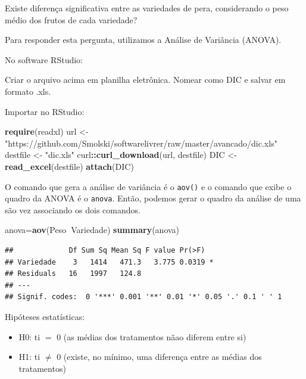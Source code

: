 \documentclass[12pt,brazil,]{book}
\newenvironment{Shaded}{\begin{snugshade}}{\end{snugshade}}
\newcommand{\KeywordTok}[1]{\textcolor[rgb]{0.13,0.29,0.53}{\textbf{#1}}}
\newcommand{\NormalTok}[1]{#1}
\newcommand{\OperatorTok}[1]{\textcolor[rgb]{0.81,0.36,0.00}{\textbf{#1}}}
\newcommand{\StringTok}[1]{\textcolor[rgb]{0.31,0.60,0.02}{#1}}
\providecommand{\tightlist}{%
  \setlength{\itemsep}{0pt}\setlength{\parskip}{0pt}}
\begin{document}
Existe diferença significativa entre as variedades de pera, considerando
o peso médio dos frutos de cada variedade?

Para responder esta pergunta, utilizamos a Análise de Variância (ANOVA).

No software RStudio:

Criar o arquivo acima em planilha eletrônica. Nomear como DIC e salvar
em formato .xls.

Importar no RStudio:

\begin{Shaded}
\begin{Highlighting}[]
\KeywordTok{require}\NormalTok{(readxl)}
\NormalTok{url <-}\StringTok{ "https://github.com/Smolski/softwarelivrer/raw/master/avancado/dic.xls"}
\NormalTok{destfile <-}\StringTok{ "dic.xls"}
\NormalTok{curl}\OperatorTok{::}\KeywordTok{curl_download}\NormalTok{(url, destfile)}
\NormalTok{DIC <-}\StringTok{ }\KeywordTok{read_excel}\NormalTok{(destfile)}
\KeywordTok{attach}\NormalTok{(DIC)}
\end{Highlighting}
\end{Shaded}

O comando que gera a análise de variância é o \texttt{aov()} e o comando
que exibe o quadro da ANOVA é o \texttt{anova}. Então, podemos gerar o
quadro da análise de uma são vez associando os dois comandos.

\begin{Shaded}
\begin{Highlighting}[]
\NormalTok{anova=}\KeywordTok{aov}\NormalTok{(Peso}\OperatorTok{~}\NormalTok{Variedade)}
\KeywordTok{summary}\NormalTok{(anova)}
\end{Highlighting}
\end{Shaded}

\begin{verbatim}
##             Df Sum Sq Mean Sq F value Pr(>F)  
## Variedade    3   1414   471.3   3.775 0.0319 *
## Residuals   16   1997   124.8                 
## ---
## Signif. codes:  0 '***' 0.001 '**' 0.01 '*' 0.05 '.' 0.1 ' ' 1
\end{verbatim}

Hipóteses estatísticas:

\begin{itemize}
\tightlist
\item
  H0: ti \(=\) 0 (as médias dos tratamentos nãao diferem entre si)
\item
  H1: ti \(\neq\) 0 (existe, no mínimo, uma diferença entre as médias
  dos tratamentos)
\end{itemize}
\end{document}

